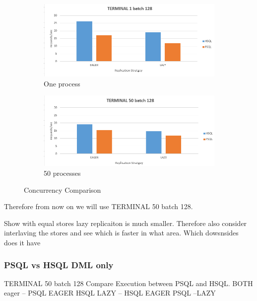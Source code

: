 \begin{figure}
    \centering
    \begin{subfigure}{.5\textwidth}
      \centering
      \includegraphics[width=.9\linewidth]{Figures/terminal1.PNG}
      \caption{One process}
      \label{fig:terminal1}
    \end{subfigure}%
    \begin{subfigure}{.5\textwidth}
      \centering
      \includegraphics[width=.9\linewidth]{Figures/terminal50.PNG}
      \caption{50 processes}
      \label{fig:terminal50}
    \end{subfigure}
    \caption{Concurrency Comparison}
    \label{fig:terminal}
\end{figure}

Therefore from now on we will use TERMINAL 50 batch 128.

Show with equal stores lazy replicaiton is much smaller. Therefore also consider interlaving the stores and see which is faster in what area.
Which dowsnsides does it have


\subsubsection{PSQL vs HSQL DML only} 
TERMINAL 50 batch 128
Compare Execution between PSQL and HSQL.
BOTH eager  -- PSQL EAGER HSQL LAZY -- HSQL EAGER PSQL --LAZY




